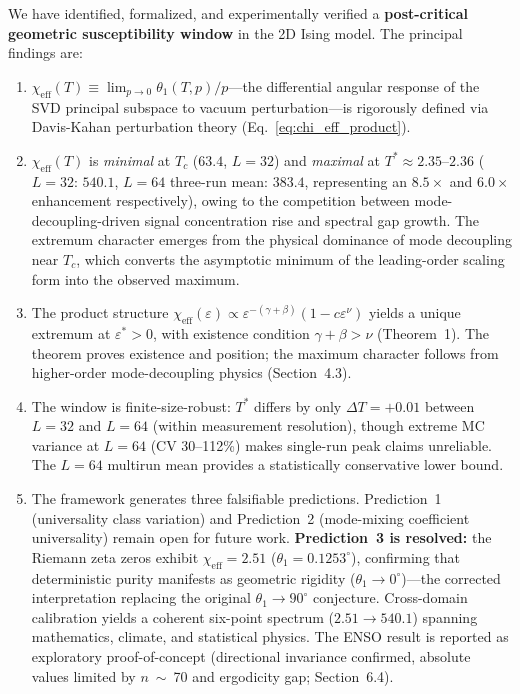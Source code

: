 \documentclass[aps,prl,twocolumn,superscriptaddress,byrevtex]{article}
\begin{document}
We have identified, formalized, and experimentally verified a \textbf{post-critical geometric susceptibility window} in the 2D Ising model. The principal findings are:

\begin{enumerate}
\item $\chi_{\text{eff}}(T) \equiv \lim_{p\to 0} \theta_1(T,p)/p$---the differential angular response of the SVD principal subspace to vacuum perturbation---is rigorously defined via Davis-Kahan perturbation theory (Eq.~\ref{eq:chi_eff_product}).

\item $\chi_{\text{eff}}(T)$ is \emph{minimal} at $T_c$ ($63.4$, $L=32$) and \emph{maximal} at $T^* \approx 2.35$--$2.36$ ($L=32$: $540.1$, $L=64$ three-run mean: $383.4$, representing an $8.5\times$ and $6.0\times$ enhancement respectively), owing to the competition between mode-decoupling-driven signal concentration rise and spectral gap growth. The extremum character emerges from the physical dominance of mode decoupling near $T_c$, which converts the asymptotic minimum of the leading-order scaling form into the observed maximum.

\item The product structure $\chi_{\text{eff}}(\varepsilon) \propto \varepsilon^{-(\gamma+\beta)}(1 - c\varepsilon^\nu)$ yields a unique extremum at $\varepsilon^* > 0$, with existence condition $\gamma + \beta > \nu$ (Theorem~1). The theorem proves existence and position; the maximum character follows from higher-order mode-decoupling physics (Section~4.3).

\item The window is finite-size-robust: $T^*$ differs by only $\Delta T = +0.01$ between $L=32$ and $L=64$ (within measurement resolution), though extreme MC variance at $L=64$ (CV 30--112\%) makes single-run peak claims unreliable. The $L=64$ multirun mean provides a statistically conservative lower bound.

\item The framework generates three falsifiable predictions. Prediction~1 (universality class variation) and Prediction~2 (mode-mixing coefficient universality) remain open for future work. \textbf{Prediction~3 is resolved:} the Riemann zeta zeros exhibit $\chi_{\text{eff}} = 2.51$ ($\theta_1 = 0.1253^\circ$), confirming that deterministic purity manifests as geometric rigidity ($\theta_1 \to 0^\circ$)---the corrected interpretation replacing the original $\theta_1 \to 90^\circ$ conjecture. Cross-domain calibration yields a coherent six-point spectrum ($2.51 \to 540.1$) spanning mathematics, climate, and statistical physics. The ENSO result is reported as exploratory proof-of-concept (directional invariance confirmed, absolute values limited by $n$~$\sim$~70 and ergodicity gap; Section~6.4).
\end{enumerate}
\end{document}
